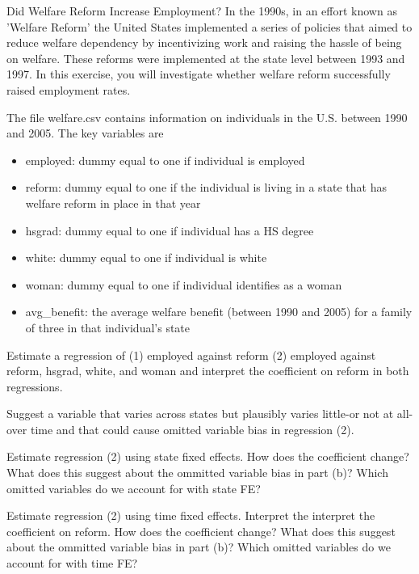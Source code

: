 \documentclass[11pt,xcolor=table]{beamer}
\begin{document}
\begin{frame}

\small
Did Welfare Reform Increase Employment?
In the 1990s, in an effort known as 'Welfare Reform' the United States implemented a series of policies that aimed to reduce welfare dependency by incentivizing work and raising the hassle of being on welfare. These reforms were implemented at the state level between 1993 and 1997. In this exercise, you will investigate whether welfare reform successfully raised employment rates.

The file welfare.csv contains information on individuals in the U.S. between 1990 and 2005. The key variables are

\begin{itemize}
\item employed: dummy equal to one if individual is employed
\item reform: dummy equal to one if the individual is living in a state that has welfare reform in place in that year
\item hsgrad: dummy equal to one if individual has a HS degree
\item white: dummy equal to one if individual is white
\item woman: dummy equal to one if individual identifies as a woman
\item avg\_benefit: the average welfare benefit (between 1990 and 2005) for a family of three in that individual's state
\end{itemize}


\end{frame}


\begin{frame}
Estimate a regression of
(1) employed against reform
(2) employed against reform, hsgrad, white, and woman and interpret the coefficient on reform in both regressions.
\end{frame}


\begin{frame}
Suggest a variable that varies across states but plausibly varies little-or not at all-over time and that could cause omitted variable bias in regression (2).

Estimate regression (2) using state fixed effects. How does the coefficient change? What does this suggest about the ommitted variable bias in part (b)? Which omitted variables do we account for with state FE?

Estimate regression (2) using time fixed effects. Interpret the interpret the coefficient on reform. How does the coefficient change? What does this suggest about the ommitted variable bias in part (b)? Which omitted variables do we account for with time FE?

\end{frame}
\end{document}
